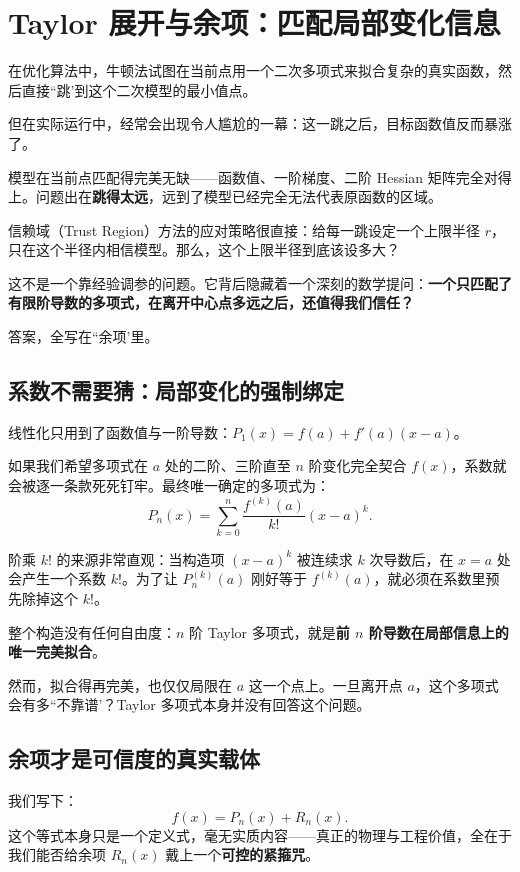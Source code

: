 \section{Taylor 展开与余项：匹配局部变化信息}
\label{sec:02-Calculus/05-Sequences-and-Series/06}

在优化算法中，牛顿法试图在当前点用一个二次多项式来拟合复杂的真实函数，然后直接``跳'到这个二次模型的最小值点。

但在实际运行中，经常会出现令人尴尬的一幕：这一跳之后，目标函数值反而暴涨了。

模型在当前点匹配得完美无缺——函数值、一阶梯度、二阶 Hessian 矩阵完全对得上。问题出在\textbf{跳得太远}，远到了模型已经完全无法代表原函数的区域。

信赖域（Trust Region）方法的应对策略很直接：给每一跳设定一个上限半径 \(r\)，只在这个半径内相信模型。那么，这个上限半径到底该设多大？

这不是一个靠经验调参的问题。它背后隐藏着一个深刻的数学提问：\textbf{一个只匹配了有限阶导数的多项式，在离开中心点多远之后，还值得我们信任？}

答案，全写在``余项'里。

\subsection{系数不需要猜：局部变化的强制绑定}

线性化只用到了函数值与一阶导数：\(P_1(x)=f(a)+f'(a)(x-a)\)。

如果我们希望多项式在 \(a\) 处的二阶、三阶直至 \(n\) 阶变化完全契合 \(f(x)\)，系数就会被逐一条款死死钉牢。最终唯一确定的多项式为：
\[
P_n(x)=\sum_{k=0}^{n}\frac{f^{(k)}(a)}{k!}(x-a)^k.
\]

阶乘 \(k!\) 的来源非常直观：当构造项 \((x-a)^k\) 被连续求 \(k\) 次导数后，在 \(x=a\) 处会产生一个系数 \(k!\)。为了让 \(P_n^{(k)}(a)\) 刚好等于 \(f^{(k)}(a)\)，就必须在系数里预先除掉这个 \(k!\)。

整个构造没有任何自由度：\(n\) 阶 Taylor 多项式，就是\textbf{前 \(n\) 阶导数在局部信息上的唯一完美拟合}。

然而，拟合得再完美，也仅仅局限在 \(a\) 这一个点上。一旦离开点 \(a\)，这个多项式会有多``不靠谱'？Taylor 多项式本身并没有回答这个问题。

\subsection{余项才是可信度的真实载体}

我们写下：
\[
f(x)=P_n(x)+R_n(x).
\]
这个等式本身只是一个定义式，毫无实质内容——真正的物理与工程价值，全在于我们能否给余项 \(R_n(x)\) 戴上一个\textbf{可控的紧箍咒}。

